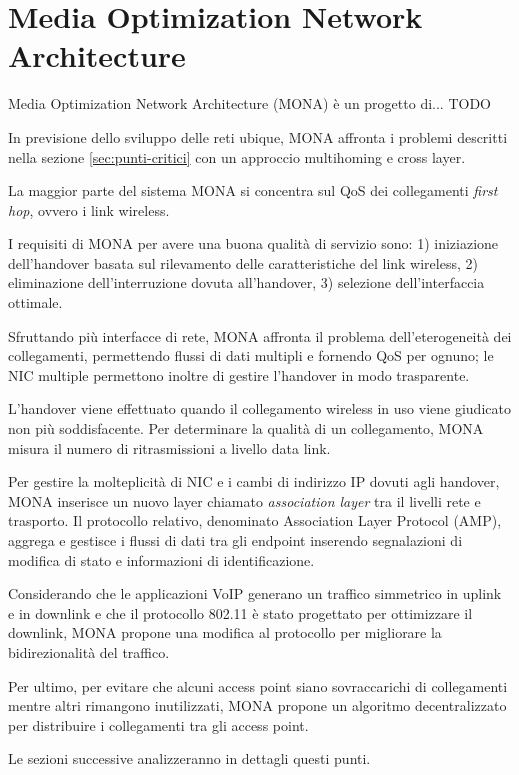 \documentclass[12pt,a4paper,openright,twoside]{book}
\begin{document}
\chapter{Media Optimization Network Architecture}

Media Optimization Network Architecture (MONA) è un progetto
di... TODO

In previsione dello sviluppo delle reti ubique, MONA affronta i
problemi descritti nella sezione \ref{sec:punti-critici} con un
approccio multihoming e cross layer.

La maggior parte del sistema MONA si concentra sul QoS dei
collegamenti \emph{first hop}, ovvero i link wireless.

I requisiti di MONA per avere una buona qualità di servizio sono:
1) iniziazione dell'handover basata sul rilevamento delle
caratteristiche del link wireless, 2) eliminazione dell'interruzione
dovuta all'handover, 3) selezione dell'interfaccia ottimale.

Sfruttando più interfacce di rete, MONA affronta il problema
dell'eterogeneità dei collegamenti, permettendo flussi di dati
multipli e fornendo QoS per ognuno; le NIC multiple permettono inoltre
di gestire l'handover in modo trasparente.

L'handover viene effettuato quando il collegamento wireless in uso
viene giudicato non più soddisfacente. Per determinare la qualità di
un collegamento, MONA misura il numero di ritrasmissioni a livello
data link.

Per gestire la molteplicità di NIC e i cambi di indirizzo IP dovuti
agli handover, MONA inserisce un nuovo layer chiamato
\emph{association layer} tra il livelli rete e trasporto. Il
protocollo relativo, denominato Association Layer Protocol (AMP),
aggrega e gestisce i flussi di dati tra gli endpoint inserendo
segnalazioni di modifica di stato e informazioni di identificazione.

Considerando che le applicazioni VoIP generano un traffico simmetrico
in uplink e in downlink e che il protocollo 802.11 è stato progettato
per ottimizzare il downlink, MONA propone una modifica al protocollo
per migliorare la bidirezionalità del traffico.

Per ultimo, per evitare che alcuni access point siano sovraccarichi di
collegamenti mentre altri rimangono inutilizzati, MONA propone un
algoritmo decentralizzato per distribuire i collegamenti tra gli
access point.

Le sezioni successive analizzeranno in dettagli questi punti.
\end{document}
